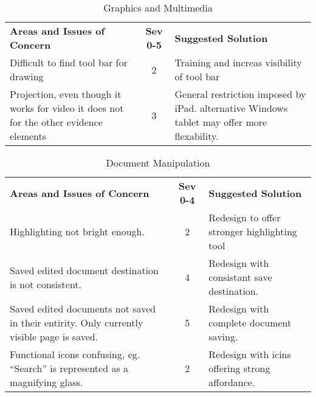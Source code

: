 \begin{center}
\begin{table}[htbp]
\label{tab:Issues_Grapgics_and_Multimedia}
  \centering
  \caption{Graphics and Multimedia}
    \begin{tabular}{|p{}|c|p{}|}
    \hline
    \rowcolor{lightgrey}\multicolumn{3}{|l|}{Graphics and Multimedia} \\
    \hline
    \textbf{Areas and Issues of Concern} & \textbf{Sev 0-5} & \textbf{Suggested Solution}\\
    \hline
    Difficult to find tool bar for drawing & 2 & Training and increas visibility of tool bar\\
    \hline
    Projection, even though it works for video it does not for the other evidence elements & 3 & General restriction imposed by iPad. alternative Windows tablet may offer more flexability.\\
    \hline
\end{tabular}
\end{table}
\end{center}

\begin{center}
\begin{table}[htbp]
\label{tab:Issues_Document_Manipulation}
  \centering
  \caption{Document Manipulation}
    \begin{tabular}{|p{}|c|p{}|}
    \hline
    \rowcolor{lightgrey}\multicolumn{3}{|l|}{Document manipulation} \\
    \hline
    \textbf{Areas and Issues of Concern} & \textbf{Sev 0-4} & \textbf{Suggested Solution}\\
    \hline
    Highlighting not bright enough. & 2 & Redesign to offer stronger highlighting tool\\
    \hline
    Saved edited document destination is not consistent. & 4 & Redesign with consistant save destination.\\
    \hline
   Saved edited documents not saved in their entirity. Only currently visible page is saved. & 5 & Redesign with complete document saving.\\
   \hline
   Functional icons confusing, eg. ``Search'' is represented as a magnifying glass. & 2 & Redesign with icins offering strong affordance.\\
   \hline
\end{tabular}
\end{table}
\end{center}


